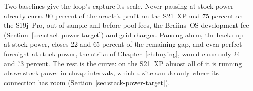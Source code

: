 Two baselines give the loop's capture its scale. Never pausing at stock power already earns 90 percent of the oracle's profit on the S21~XP and 75 percent on the S19j~Pro, out of sample and before pool fees, the Braiins~OS development fee (Section~\ref{sec:stack-power-target}) and grid charges. Pausing alone, the backstop at stock power, closes 22 and 65 percent of the remaining gap, and even perfect foresight at stock power, the strike of Chapter~\ref{ch:buying}, would close only 24 and 73 percent. %
The rest is the curve: on the S21~XP almost all of it is running above stock power in cheap intervals, which a site can do only where its connection has room (Section~\ref{sec:stack-power-target}). %
